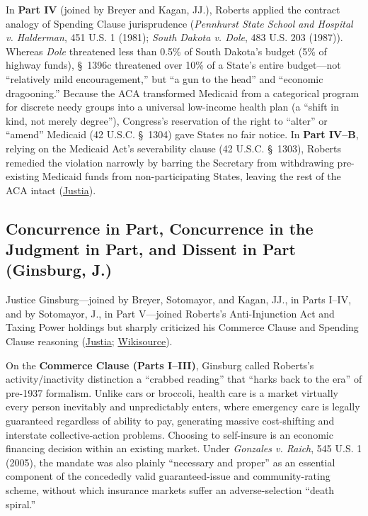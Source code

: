 \documentclass[12pt]{article}
\begin{document}
In \textbf{Part IV} (joined by Breyer and Kagan, JJ.), Roberts applied the contract analogy of Spending Clause jurisprudence (\textit{Pennhurst State School and Hospital v. Halderman}, 451 U.S. 1 (1981); \textit{South Dakota v. Dole}, 483 U.S. 203 (1987)). Whereas \textit{Dole} threatened less than 0.5\% of South Dakota's budget (5\% of highway funds), \S~1396c threatened over 10\% of a State's entire budget---not ``relatively mild encouragement,'' but ``a gun to the head'' and ``economic dragooning.'' Because the ACA transformed Medicaid from a categorical program for discrete needy groups into a universal low-income health plan (a ``shift in kind, not merely degree''), Congress's reservation of the right to ``alter'' or ``amend'' Medicaid (42 U.S.C. \S~1304) gave States no fair notice. In \textbf{Part IV--B}, relying on the Medicaid Act's severability clause (42 U.S.C. \S~1303), Roberts remedied the violation narrowly by barring the Secretary from withdrawing pre-existing Medicaid funds from non-participating States, leaving the rest of the ACA intact (\href{https://supreme.justia.com/cases/federal/us/567/519/}{Justia}).

\subsection{Concurrence in Part, Concurrence in the Judgment in Part, and Dissent in Part (Ginsburg, J.)}
Justice Ginsburg---joined by Breyer, Sotomayor, and Kagan, JJ., in Parts I--IV, and by Sotomayor, J., in Part V---joined Roberts's Anti-Injunction Act and Taxing Power holdings but sharply criticized his Commerce Clause and Spending Clause reasoning (\href{https://supreme.justia.com/cases/federal/us/567/519/}{Justia}; \href{https://en.wikisource.org/wiki/National_Federation_of_Independent_Business_v._Sebelius/Concurrence-dissent_Ginsburg}{Wikisource}).

On the \textbf{Commerce Clause (Parts I--III)}, Ginsburg called Roberts's activity/inactivity distinction a ``crabbed reading'' that ``harks back to the era'' of pre-1937 formalism. Unlike cars or broccoli, health care is a market virtually every person inevitably and unpredictably enters, where emergency care is legally guaranteed regardless of ability to pay, generating massive cost-shifting and interstate collective-action problems. Choosing to self-insure is an economic financing decision within an existing market. Under \textit{Gonzales v. Raich}, 545 U.S. 1 (2005), the mandate was also plainly ``necessary and proper'' as an essential component of the concededly valid guaranteed-issue and community-rating scheme, without which insurance markets suffer an adverse-selection ``death spiral.''
\end{document}
